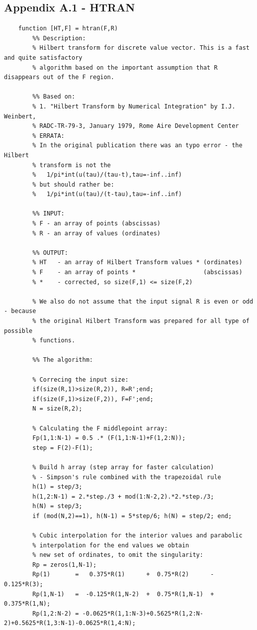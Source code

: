 \documentclass[12pt,twoside,a4paper]{article}
\numberwithin{equation}{subsection}
\numberwithin{figure}{subsection}
\begin{document}
\subsection*{Appendix A.1 - HTRAN}
\begin{lstlisting}
	function [HT,F] = htran(F,R)
	    %% Description:
	    % Hilbert transform for discrete value vector. This is a fast and quite satisfactory 
	    % algorithm based on the important assumption that R disappears out of the F region.
	
	    %% Based on:
	    % 1. "Hilbert Transform by Numerical Integration" by I.J. Weinbert, 
	    % RADC-TR-79-3, January 1979, Rome Aire Development Center
	    % ERRATA:
	    % In the original publication there was an typo error - the Hilbert
	    % transform is not the 
	    %   1/pi*int(u(tau)/(tau-t),tau=-inf..inf) 
	    % but should rather be:
	    %   1/pi*int(u(tau)/(t-tau),tau=-inf..inf) 
	    
	    %% INPUT:
	    % F - an array of points (abscissas)
	    % R - an array of values (ordinates)
	    
	    %% OUTPUT:
	    % HT   - an array of Hilbert Transform values * (ordinates)
	    % F    - an array of points *                   (abscissas) 
	    % *    - corrected, so size(F,1) <= size(F,2)
	    
	    % We also do not assume that the input signal R is even or odd - because
	    % the original Hilbert Transform was prepared for all type of possible
	    % functions.
	
	    %% The algorithm:
	   
	    % Correcing the input size:
	    if(size(R,1)>size(R,2)), R=R';end;
	    if(size(F,1)>size(F,2)), F=F';end;
	    N = size(R,2);
	    
	    % Calculating the F middlepoint array:
	    Fp(1,1:N-1) = 0.5 .* (F(1,1:N-1)+F(1,2:N));
	    step = F(2)-F(1);
	    
	    % Build h array (step array for faster calculation) 
	    % - Simpson's rule combined with the trapezoidal rule
	    h(1) = step/3;
	    h(1,2:N-1) = 2.*step./3 + mod(1:N-2,2).*2.*step./3;
	    h(N) = step/3;
	    if (mod(N,2)==1), h(N-1) = 5*step/6; h(N) = step/2; end;
	    
	    % Cubic interpolation for the interior values and parabolic 
	    % interpolation for the end values we obtain
	    % new set of ordinates, to omit the singularity:
	    Rp = zeros(1,N-1);
	    Rp(1)       =   0.375*R(1)      +  0.75*R(2)      - 0.125*R(3);
	    Rp(1,N-1)   =  -0.125*R(1,N-2)  +  0.75*R(1,N-1)  + 0.375*R(1,N);
	    Rp(1,2:N-2) = -0.0625*R(1,1:N-3)+0.5625*R(1,2:N-2)+0.5625*R(1,3:N-1)-0.0625*R(1,4:N);
	    

\end{lstlisting}
\end{document}
